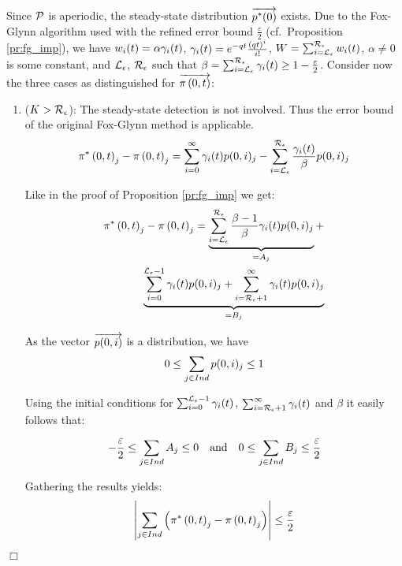 \documentclass[times, 10pt,twocolumn]{article}
\newenvironment{proof}{\trivlist \item[\hskip \labelsep{\bf Proof}]}{\hfill\hbox{$\Box$}\endtrivlist}
\begin{document}
		{\small
		\begin{proof}
			Since $\mathcal{P}$ is aperiodic, the steady-state distribution $\overrightarrow{p^{*}(0)}$ exists.  Due to the Fox-Glynn algorithm used with the refined error bound $\frac{\varepsilon}{2}$ (cf.\ Proposition \ref{pr:fg_imp}), we have $w_{i}(t) = \alpha \gamma_{i}(t)$, $\gamma_{i}(t) = e^{-q t}\frac{\left( q t \right)^{i}}{i!} $, $W = \sum_{i = \mathcal{L}_{\epsilon}}^{\mathcal{R}_{\epsilon}} w_{i}(t)$, $\alpha \neq 0$ is some constant, and $\mathcal{L}_{\epsilon}$, $\mathcal{R}_{\epsilon}$ such that $\beta = \sum_{i=\mathcal{L}_{\epsilon}}^{\mathcal{R}_{\epsilon}} \gamma_{i}(t) \geq 1 - \frac{\varepsilon}{2}$.
			Consider now the three cases as distinguished for $\overrightarrow{\pi \left(0, t \right )}$:
			\begin{enumerate}
					
				\item ($K > \mathcal{R}_{\epsilon}$):  The steady-state detection is not involved. Thus the error bound of the original Fox-Glynn method is applicable.
					\[
						\pi^{*} \left(0, t \right )_{j} - \pi \left(0, t \right )_{j} =\sum_{i=0}^{\infty} \gamma_{i}(t) p(0,i)_{j} - \sum_{i=\mathcal{L}_{\epsilon}}^{\mathcal{R}_{\epsilon}}\frac{\gamma_{i}(t)}{\beta} p(0,i)_{j}
					\]

					Like in the proof of Proposition \ref{pr:fg_imp} we get:
					\begin{eqnarray}
						\pi^{*} \left(0, t \right )_{j} - \pi \left(0, t \right )_{j} = \underbrace{\sum_{i=\mathcal{L}_{\epsilon}}^{\mathcal{R}_{\epsilon}}\frac{\beta - 1}{\beta} \gamma_{i}(t) p(0,i)_{j}}_{=A_{j}} + \nonumber \\
						\underbrace{\sum_{i=0}^{\mathcal{L}_{\epsilon}-1} \gamma_{i}(t) p(0,i)_{j} + 
						\sum_{i=\mathcal{R}_{\epsilon}+1}^{\infty} \gamma_{i}(t) p(0,i)_{j}}_{=B_{j}} \nonumber
					\end{eqnarray}
												
					As the vector $\overrightarrow{p(0,i)}$ is a distribution, we have \[ 0 \leq \sum_{j \in Ind} p(0,i)_{j} \leq 1 \]
					
					Using the initial conditions for $\sum_{i=0}^{\mathcal{L}_{\epsilon}-1} \gamma_{i}(t) $, $\sum_{i=\mathcal{R}_{\epsilon}+1}^{\infty} \gamma_{i}(t) $ and $\beta$ it easily follows that:
					
					\[
						- \frac{\varepsilon}{2} \leq \sum_{j \in Ind} A_{j} \leq 0 \quad
						\text{and} \quad
						0 \leq \sum_{j \in Ind} B_{j} \leq \frac{\varepsilon}{2}
					\]

					Gathering the results yields:
					\[
						\left| \sum_{j \in Ind} \left( \pi^{*} \left(0, t \right )_{j} - \pi \left(0, t \right )_{j} \right) \right| \leq \frac{\varepsilon}{2}
					\]
						

\end{enumerate}
\end{proof}}
\end{document}
